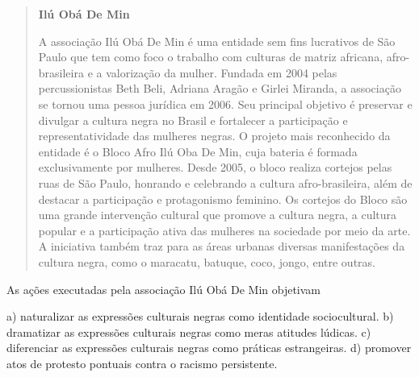 \begin{quote}
\textbf{Ilú Obá De Min}

A associação Ilú Obá De Min é uma entidade sem fins lucrativos de São Paulo que tem como foco o trabalho com culturas de matriz africana, afro-brasileira e a valorização da mulher. Fundada em 2004 pelas percussionistas Beth Beli, Adriana Aragão e Girlei Miranda, a associação se tornou uma pessoa jurídica em 2006. Seu principal objetivo é preservar e divulgar a cultura negra no Brasil e fortalecer a participação e representatividade das mulheres negras. O projeto mais reconhecido da entidade é o Bloco Afro Ilú Oba De Min, cuja bateria é formada exclusivamente por mulheres. Desde 2005, o bloco realiza cortejos pelas ruas de São Paulo, honrando e celebrando a cultura afro-brasileira, além de destacar a participação e protagonismo feminino. Os cortejos do Bloco são uma grande intervenção cultural que promove a cultura negra, a cultura popular e a participação ativa das mulheres na sociedade por meio da arte. A iniciativa também traz para as áreas urbanas diversas manifestações da cultura negra, como o maracatu, batuque, coco, jongo, entre outras.

\end{quote}

As ações executadas pela associação Ilú Obá De Min objetivam

a)  naturalizar as expressões culturais negras como identidade
    sociocultural.
b)  dramatizar as expressões culturais negras como meras atitudes
    lúdicas.
c)  diferenciar as expressões culturais negras como práticas
    estrangeiras.
d)  promover atos de protesto pontuais contra o racismo persistente.


